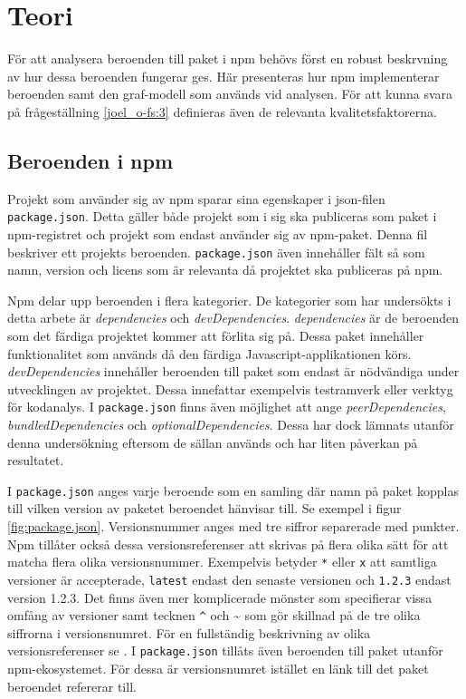 \section{Teori}
\label{sec:joel_o-theory}
För att analysera beroenden till paket i npm behövs först en robust beskrvning av hur dessa beroenden fungerar ges. Här presenteras hur npm implementerar beroenden samt den graf-modell som används vid analysen. För att kunna svara på frågeställning \ref{joel_o-fs:3} definieras även de relevanta kvalitetsfaktorerna.

\subsection{Beroenden i npm}
Projekt som använder sig av npm sparar sina egenskaper i json-filen \texttt{package.json}\cite{npm-package.json}. Detta gäller både projekt som i sig ska publiceras som paket i npm-registret och projekt som endast använder sig av npm-paket.
Denna fil beskriver ett projekts beroenden. \texttt{package.json} även innehåller fält så som namn, version och licens som är relevanta då projektet ska publiceras på npm.

Npm delar upp beroenden i flera kategorier. De kategorier som har undersökts i detta arbete är \textit{dependencies} och \textit{devDependencies}. \textit{dependencies} är de beroenden som det färdiga projektet kommer att förlita sig på. Dessa paket innehåller funktionalitet som används då den färdiga Javascript-applikationen körs. \textit{devDependencies} innehåller beroenden till paket som endast är nödvändiga under utvecklingen av projektet. Dessa innefattar exempelvis testramverk eller verktyg för kodanalys. I \texttt{package.json} finns även möjlighet att ange \textit{peerDependencies}, \textit{bundledDependencies} och \textit{optionalDependencies}. Dessa har dock lämnats utanför denna undersökning eftersom de sällan används och har liten påverkan på resultatet.

I \texttt{package.json} anges varje beroende som en samling där namn på paket kopplas till vilken version av paketet beroendet hänvisar till. Se exempel i figur \ref{fig:package.json}. Versionsnummer anges med tre siffror separerade med punkter.\cite{npm-semver} Npm tillåter också dessa versionsreferenser att skrivas på flera olika sätt för att matcha flera olika versionsnummer. Exempelvis betyder \texttt{*} eller \texttt{x} att samtliga versioner är accepterade, \texttt{latest} endast den senaste versionen och \texttt{1.2.3} endast version 1.2.3. Det finns även mer komplicerade mönster som specifierar vissa omfång av versioner samt tecknen \texttt{\^} och {\textasciitilde} som gör skillnad på de tre olika siffrorna i versionsnumret. För en fullständig beskrivning av olika versionsreferenser se \cite{npm-semver}. I \texttt{package.json} tillåts även beroenden till paket utanför npm-ekosystemet. För dessa är versionsnumret istället en länk till det paket beroendet refererar till.

